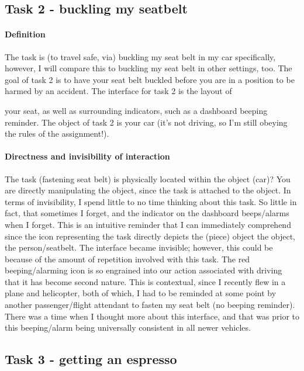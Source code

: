 \subsection{Task 2 - buckling my seatbelt}

\paragraph{Definition}
The task is (to travel safe, via) buckling my seat belt in my car specifically, however, I will compare this to buckling my seat belt in other settings, too. The goal of task 2 is to have your seat belt buckled before you are in a position to be harmed by an accident. The interface for task 2 is the layout of

\clearpage

your seat, as well as surrounding indicators, such as a dashboard beeping reminder. The object of task 2 is your car (it's not driving, so I'm still obeying the rules of the assignment!).

\paragraph{Directness and invisibility of interaction}
The task (fastening seat belt) is physically located within the object (car)? You are directly manipulating the object, since the task is attached to the object. In terms of invisibility, I spend little to no time thinking about this task. So little in fact, that sometimes I forget, and the indicator on the dashboard beeps/alarms when I forget. This is an intuitive reminder that I can immediately comprehend since the icon representing the task directly depicts the (piece) object the object, the person/seatbelt. The interface became invisible; however, this could be because of the amount of repetition involved with this task. The red beeping/alarming icon is so engrained into our action associated with driving that it has become second nature. This is contextual, since I recently flew in a plane and helicopter, both of which, I had to be reminded at some point by another passenger/flight attendant to fasten my seat belt (no beeping reminder). There was a time when I thought more about this interface, and that was prior to this beeping/alarm being universally consistent in all newer vehicles.

\subsection{Task 3 - getting an espresso}


